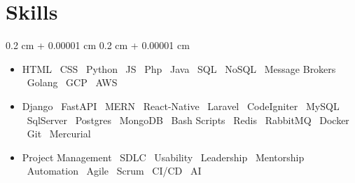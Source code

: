 \documentclass[10pt, letterpaper]{article}
\newenvironment{highlights}{
    \begin{itemize}[
        topsep=0.10 cm,
        parsep=0.10 cm,
        partopsep=0pt,
        itemsep=0pt,
        leftmargin=0.4 cm + 10pt
    ]
}{
    \end{itemize}
} %
\newenvironment{onecolentry}{
    \begin{adjustwidth}{
        0.2 cm + 0.00001 cm
    }{
        0.2 cm + 0.00001 cm
    }
}{
    \end{adjustwidth}
} %
\begin{document}
        \vspace{0.02 cm}

    \section{Skills}



        
        \begin{onecolentry}
            \begin{highlights}
                \item HTML \textbar\ CSS \textbar\ Python \textbar\ JS \textbar\ Php \textbar\ Java \textbar\ SQL \textbar\ NoSQL \textbar\ Message Brokers \textbar\ Golang \textbar\ GCP \textbar\ AWS
                \item Django \textbar\ FastAPI \textbar\ MERN \textbar\ React-Native \textbar\ Laravel \textbar\ CodeIgniter \textbar\ MySQL \textbar\ SqlServer \textbar\ Postgres \textbar\ MongoDB \textbar\ Bash Scripts \textbar\ Redis \textbar\ RabbitMQ \textbar\ Docker \textbar\ Git \textbar\ Mercurial
                \item Project Management \textbar\ SDLC \textbar\ Usability \textbar\ Leadership \textbar\ Mentorship \textbar\ Automation \textbar\ Agile \textbar\ Scrum \textbar\ CI/CD \textbar\ AI
            \end{highlights}
        \end{onecolentry}


    
\end{document}
